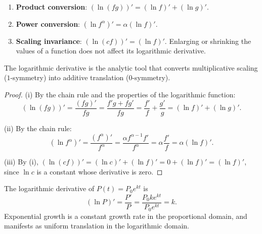 \begin{proposition}\label{prop:log_derivative_scaling}
\begin{enumerate}[label=(\roman*)]
    \item \textbf{Product conversion}: $(\ln(fg))' = (\ln f)' + (\ln g)'$.
    \item \textbf{Power conversion}: $(\ln f^\alpha)' = \alpha (\ln f)'$.
    \item \textbf{Scaling invariance}: $(\ln(cf))' = (\ln f)'$. Enlarging or shrinking the values of a function does not affect its logarithmic derivative.
\end{enumerate}
The logarithmic derivative is the analytic tool that converts multiplicative scaling ($1$-symmetry) into additive translation ($0$-symmetry).
\end{proposition}

\begin{proof}
(i) By the chain rule and the properties of the logarithmic function:
\[
(\ln(fg))' = \frac{(fg)'}{fg} = \frac{f'g + fg'}{fg} = \frac{f'}{f} + \frac{g'}{g} = (\ln f)' + (\ln g)'.
\]

(ii) By the chain rule:
\[
(\ln f^\alpha)' = \frac{(f^\alpha)'}{f^\alpha} = \frac{\alpha f^{\alpha-1} f'}{f^\alpha} = \alpha \frac{f'}{f} = \alpha(\ln f)'.
\]

(iii) By (i), $(\ln(cf))' = (\ln c)' + (\ln f)' = 0 + (\ln f)' = (\ln f)'$, since $\ln c$ is a constant whose derivative is zero.
\end{proof}

\begin{example}\label{ex:exponential_log_derivative}
The logarithmic derivative of $P(t) = P_0 e^{kt}$ is
\[
(\ln P)' = \frac{P'}{P} = \frac{P_0 k e^{kt}}{P_0 e^{kt}} = k.
\]
Exponential growth is a constant growth rate in the proportional domain, and manifests as uniform translation in the logarithmic domain.
\end{example}

